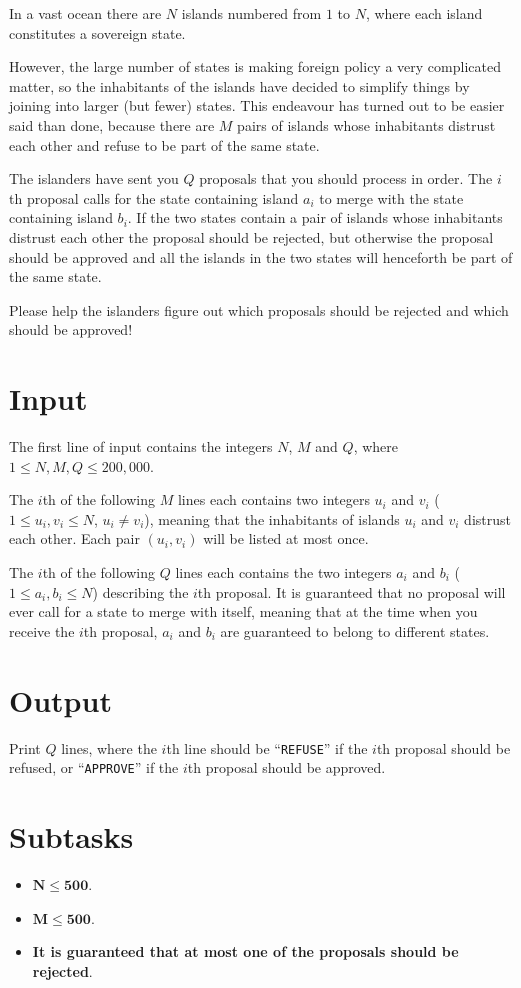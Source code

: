 In a vast ocean there are $N$ islands numbered from $1$ to $N$, where each
island constitutes a sovereign state.

However, the large number of states is making foreign policy a very complicated
matter, so the inhabitants of the islands have decided to simplify things by
joining into larger (but fewer) states. This endeavour has turned out to be
easier said than done, because there are $M$ pairs of islands whose inhabitants
distrust each other and refuse to be part of the same state.

The islanders have sent you $Q$ proposals that you should process in order. The
$i$th proposal calls for the state containing island $a_i$ to merge with the
state containing island $b_i$. If the two states contain a pair of islands
whose inhabitants distrust each other the proposal should be rejected, but
otherwise the proposal should be approved and all the islands in the two states
will henceforth be part of the same state.

Please help the islanders figure out which proposals should be rejected and
which should be approved!

\section*{Input}
The first line of input contains the integers $N$, $M$ and $Q$, where $1 \leq
N,M,Q \leq 200,000$.

The $i$th of the following $M$ lines each contains two integers $u_i$ and $v_i$
($1 \leq u_i,v_i \leq N$, $u_i \neq v_i$), meaning that the inhabitants of
islands $u_i$ and $v_i$ distrust each other. Each pair $(u_i, v_i)$ will be
listed at most once.

The $i$th of the following $Q$ lines each contains the two integers $a_i$ and
$b_i$ ($1 \leq a_i,b_i \leq N$) describing the $i$th proposal. It is guaranteed
that no proposal will ever call for a state to merge with itself, meaning that
at the time when you receive the $i$th proposal, $a_i$ and $b_i$ are guaranteed
to belong to different states.

\section*{Output}
Print $Q$ lines, where the $i$th line should be ``\texttt{REFUSE}'' if the $i$th
proposal should be refused, or ``\texttt{APPROVE}'' if the $i$th proposal should
be approved.

\section*{Subtasks}
\begin{itemize}
    \item $\mathbf{N} \mathbf{\leq} \mathbf{500}$.
    \item $\mathbf{M} \mathbf{\leq} \mathbf{500}$.
    \item \textbf{It is guaranteed that at most one of the proposals should be
    rejected}.
\end{itemize}

